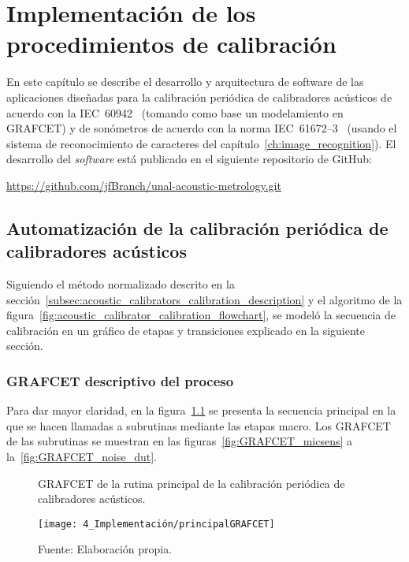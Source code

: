 
\chapter{Implementación de los procedimientos de calibración}

En este capítulo se describe el desarrollo y arquitectura de software de las aplicaciones diseñadas para la calibración periódica de calibradores acústicos de acuerdo con la \mbox{IEC 60942}~\citeyearpar{IEC_TC29_2017} (tomando como base un modelamiento en GRAFCET) y de sonómetros de acuerdo con la norma \mbox{IEC 61672--3}~\citeyearpar{IEC_TC29_2013_1} (usando el sistema de reconocimiento de caracteres del capítulo~\ref{ch:image_recognition}).
El desarrollo del \emph{software} está publicado en el siguiente repositorio de GitHub:

    {\footnotesize\url{https://github.com/jfBranch/unal-acoustic-metrology.git}}


\section{Automatización de la calibración periódica de calibradores acústicos}
\label{sec:acoustic_calibrators_automation}
Siguiendo el método normalizado descrito en la sección~\ref{subsec:acoustic_calibrators_calibration_description} y el algoritmo de la figura~\ref{fig:acoustic_calibrator_calibration_flowchart}, se modeló la secuencia de calibración en un gráfico de etapas y transiciones explicado en la siguiente sección.

\subsection{GRAFCET descriptivo del proceso}
Para dar mayor claridad, en la figura~\ref{fig:GRAFCET_principal} se presenta la secuencia principal en la que se hacen llamadas a subrutinas mediante las etapas macro.
Los GRAFCET de las subrutinas se muestran en las figuras~\ref{fig:GRAFCET_micsens} a la~\ref{fig:GRAFCET_noise_dut}.
\vfill
\clearpage

\begin{figure}[!hp]
    \caption{GRAFCET de la rutina principal de la calibración periódica de calibradores acústicos.}
    \label{fig:GRAFCET_principal}
    \centering
    \texttt{[image: 4\_Implementación/principalGRAFCET]}
    \caption*{\footnotesize Fuente: Elaboración propia.}
\end{figure}

